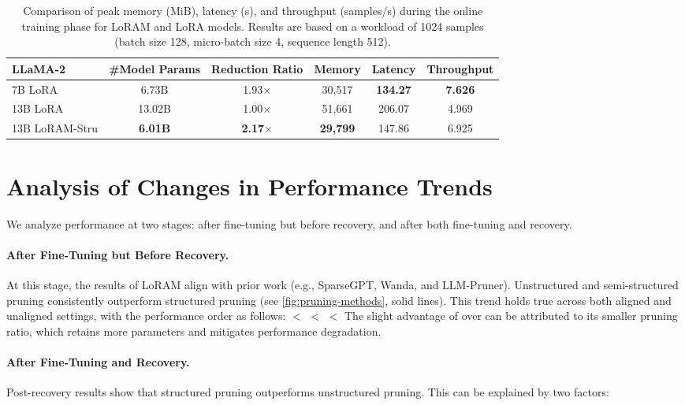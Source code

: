 \begin{table*}[ht]
\centering
\caption{{Comparison of peak memory (MiB), latency (s), and throughput (samples/s) during the online training phase for LoRAM and LoRA models. Results are based on a workload of 1024 samples (batch size 128, micro-batch size 4, sequence length 512).}}
{
\label{tab:lora_comparison}
\begin{tabular}{@{}lccccc@{}}
\toprule
\textbf{LLaMA-2}            & \textbf{\#Model Params} & \textbf{Reduction Ratio} & \textbf{Memory} & \textbf{Latency} & \textbf{Throughput} \\
\midrule
7B LoRA           & 6.73B                & 1.93$\times$             & 30,517                     & \textbf{134.27}      & \textbf{7.626}                 \\
13B LoRA          & 13.02B               & 1.00$\times$             & 51,661                     & 206.07               & 4.969                          \\
13B LoRAM-Stru    & \textbf{6.01B}       & \textbf{2.17$\times$}    & \textbf{29,799}            & 147.86               & 6.925                          \\
\bottomrule
\end{tabular}}
\end{table*}

\clearpage
\section{{Analysis of Changes in Performance Trends}}
{We analyze performance at two stages: after fine-tuning but before recovery, and after both fine-tuning and recovery.}
{\paragraph{After Fine-Tuning but Before Recovery.}
At this stage, the results of LoRAM align with prior work (e.g., SparseGPT, Wanda, and LLM-Pruner). Unstructured and semi-structured pruning consistently outperform structured pruning (see \cref{fig:pruning-methods}, solid lines). This trend holds true across both aligned and unaligned settings, with the performance order as follows: \methodsemi $<$ \methodunst $<$ \methodstru $<$ \methodrand
The slight advantage of \methodsemi over \methodunst can be attributed to its smaller pruning ratio, which retains more parameters and mitigates performance degradation.}
{\paragraph{After Fine-Tuning and Recovery.}
Post-recovery results show that structured pruning outperforms unstructured pruning. This can be explained by two factors:}

